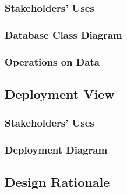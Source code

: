 \documentclass[a4paper]{article}
\begin{document}
    \subsubsection{Stakeholders' Uses}
    \lipsum[1-1]
    \subsubsection{Database Class Diagram}
    \subsubsection{Operations on Data}
    \lipsum[1-1]
    \subsection{Deployment View}
    \subsubsection{Stakeholders' Uses}
    \lipsum[1-1]
    \subsubsection{Deployment Diagram}
    \subsection{Design Rationale}
    \lipsum[1-1]
    
\end{document}
